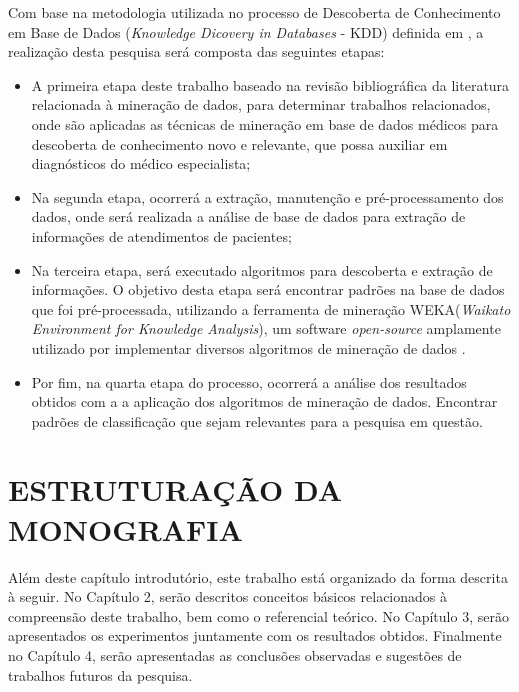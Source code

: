 \documentclass[
	12pt,				%
	openright,			%
	oneside,	
	a4paper,				%
	english,				%
	brazil				%
]{abntex2/abntex2} %
\begin{document}
		Com base na metodologia utilizada no processo de Descoberta de Conhecimento em Base de Dados (\textit{Knowledge Dicovery in Databases} - KDD) definida em \cite{fayyad:1996}, a realização desta pesquisa será composta das seguintes etapas:
		
		\begin{itemize}
			
			\item A primeira etapa deste trabalho baseado na revisão bibliográfica da literatura relacionada à mineração de dados, para determinar trabalhos relacionados, onde são aplicadas as técnicas de mineração em base de dados médicos para descoberta de conhecimento novo e relevante, que possa auxiliar em diagnósticos do médico especialista;
			
			\item Na segunda etapa, ocorrerá a extração, manutenção e pré-processamento dos dados, onde será realizada a análise  de base de dados para extração de informações de atendimentos de pacientes;
			
			\item Na terceira etapa, será executado algoritmos para descoberta e extração de informações. O objetivo desta etapa será encontrar padrões na base de dados que foi pré-processada, utilizando a ferramenta de mineração WEKA(\textit{Waikato Environment for Knowledge Analysis}), um software \textit{open-source} \cite{opensource:2015} amplamente utilizado por implementar diversos algoritmos de mineração de dados \cite{hall:2009}.
			
			
			\item Por fim,  na quarta etapa do processo, ocorrerá a análise dos resultados obtidos com a a aplicação dos algoritmos de mineração de dados. Encontrar padrões de classificação que sejam relevantes para a pesquisa em questão.
			
		\end{itemize}
	
	\section{ESTRUTURAÇÃO DA MONOGRAFIA}
	
		Além deste capítulo introdutório, este trabalho está organizado da forma descrita à seguir. No Capítulo 2, serão descritos conceitos básicos relacionados à compreensão deste trabalho, bem como o referencial teórico. No Capítulo 3, serão apresentados os experimentos juntamente com os resultados obtidos. Finalmente no Capítulo 4, serão apresentadas as conclusões observadas e sugestões de trabalhos futuros da pesquisa.
\end{document}
